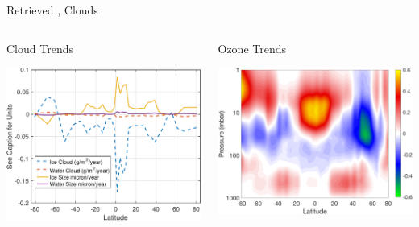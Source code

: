 \documentclass[10pt,t]{beamer}
\begin{document}
\begin{frame}[label={sec:org3cfa010}]{Retrieved \ozone, Clouds}
\vspace{-0.35in}

\begin{columns}
\begin{column}{0.55\columnwidth}
\begin{block}{\footnotesize Cloud Trends}
\vspace{-0.1in}
\begin{center}
\includegraphics[width=0.9\linewidth]{./Figs/Pdf/cloud_trend.pdf}
\end{center}
\end{block}
\end{column}

\begin{column}{0.55\columnwidth}
\begin{block}{\footnotesize Ozone Trends}
\vspace{-0.1in}
\begin{center}
\includegraphics[width=0.9\linewidth]{./Figs/Png/o3_trend_upto_1mbar.png}
\end{center}
\end{block}
\end{column}
\end{columns}



\end{frame}
\end{document}
